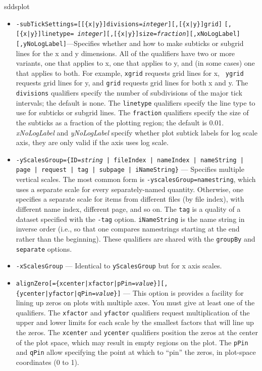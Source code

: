 \begin{sddsprog}{sddsplot}
\begin{itemize}
\begin{itemize}
  \item {\tt -subTickSettings=[[\{x|y\}]divisions={\em integer}][,[\{x|y\}]grid]} {\tt [,[\{x|y\}]linetype={\em
integer}][,[\{x|y\}]size={\em fraction}][,xNoLogLabel][,yNoLogLabel]}---Specifies whether and how to make subticks or subgrid lines for the
x and y dimensions.  All of the qualifiers have two or more variants, one that applies to x, one that applies
to y, and (in some cases) one that applies to both.  For example, {\tt xgrid} requests grid lines for x, {\tt
ygrid} requests grid lines for y, and {\tt grid} requests grid lines for both x and y.  The {\tt divisions}
qualifiers specify the number of subdivisions of the major tick intervals; the default is none.  The {\tt linetype}
qualifiers specify the line type to use for subticks or subgrid lines.  The {\tt fraction} qualifiers specify
the size of the subticks as a fraction of the plotting region; the default is 0.01. {\em xNoLogLabel} and {\em yNoLogLabel} specify whether plot subtick labels for log scale axis, they are only valid if the axis uses log scale.

  \item {\tt -yScalesGroup=\{ID={\em string} | fileIndex | nameIndex | nameString | page | request | tag | subpage | iNameString\}} --- 
        Specifies multiple vertical scales.  The most common form is {\tt -yscalesGroup=namestring}, which
        uses a separate scale for every separately-named quantity.  Otherwise, one specifies a separate
        scale for items from different files (by file index), with different name index, different page,
        and so on.  The \verb|tag| is a quality of a dataset specified with the \verb|-tag| option.
        \verb|iNameString| is the name string in inverse order (i.e., so that one compares namestrings
        starting at the end rather than the beginning).  These qualifiers are shared with the
        \verb|groupBy| and \verb|separate| options.
        
  \item {\tt -xScalesGroup} --- Identical to \verb|yScalesGroup| but for x axis scales.

  \item {\tt alignZero[=\{xcenter|xfactor|pPin={\em value}\}][,\{ycenter|yfactor|qPin={\em value}\}]} ---
  This option is provides a facility for lining up zeros on plots with multiple axes.  You must give
at least one of the qualifiers.  The {\tt xfactor} and {\tt yfactor} qualifiers request multiplication
of the upper and lower limits for each scale by the smallest factors that will line up the zeros.
The {\tt xcenter} and {\tt ycenter} qualifiers position the zeros at the center of the plot space,
which may result in empty regions on the plot.  The {\tt pPin} and {\tt qPin} allow specifying the
point at which to ``pin'' the zeros, in plot-space coordinates (0 to 1).


\end{itemize}
\end{itemize}
\end{sddsprog}
